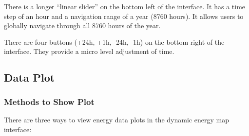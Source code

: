 There is a longer ``linear slider'' on the bottom left of the
interface. It has a time step of an hour and a navigation range of a
year (8760 hours). It allows users to globally navigate through all
8760 hours of the year.

There are four buttons (+24h, +1h, -24h, -1h) on the bottom right of
the interface. They provide a micro level adjustment of time.

\subsection{Data Plot}
\subsubsection{Methods to Show Plot}
There are three ways to view energy data plots in the dynamic energy
map interface:
